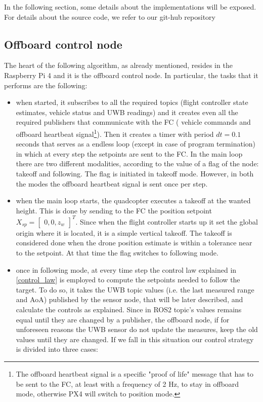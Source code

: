 In the following section, some details about the implementations will be exposed. For details about the source code, we refer to our git-hub repository \cite{git-repo}

\subsection{Offboard control node}
The heart of the following algorithm, as already mentioned, resides in the Raspberry Pi 4 and it is the offboard control node. In particular, the tasks that it performs are the following: 
\begin{itemize}
    \item when started, it subscribes to all the required topics (flight controller state estimates, vehicle status and UWB readings) and it creates even all the required publishers that communicate with the FC ( vehicle commands and offboard heartbeat signal\footnote{The offboard heartbeat signal is a specific "proof of life" message that has to be sent to the FC, at least with a frequency of 2 Hz, to stay in offboard mode, otherwise PX4 will switch to position mode.}). Then it creates a timer with period $dt=0.1$ seconds that serves as a endless loop (except in case of program termination) in which at every step the setpoints are sent to the FC. In the main loop there are two different modalities, according to the value of a flag of the node: takeoff and following. The flag is initiated in takeoff mode. However, in both the modes the offboard heartbeat signal is sent once per step.
    \item when the main loop starts, the quadcopter executes a takeoff at the wanted height. This is done by sending to the FC the position setpoint $X_{sp}=\begin{bmatrix} 0,0,z_{w} \end{bmatrix}^T$. Since when the flight controller starts up it set the global origin where it is located, it is a simple vertical takeoff. The takeoff is considered done when the drone position estimate is within a tolerance near to the setpoint. At that time the flag switches to following mode.
    \item once in following mode, at every time step the control law explained in \autoref{control_law} is employed to compute the setpoints needed to follow the target. To do so, it takes the UWB topic values (i.e. the last measured range and AoA) published by the sensor node, that will be later described, and calculate the controls as explained.
    Since in ROS2 topic's values remains equal until they are changed by a publisher, the offboard node, if for unforeseen reasons the UWB sensor do not update the measures, keep the old values until they are changed. If we fall in this situation our control strategy is divided into three cases:

\end{itemize}
